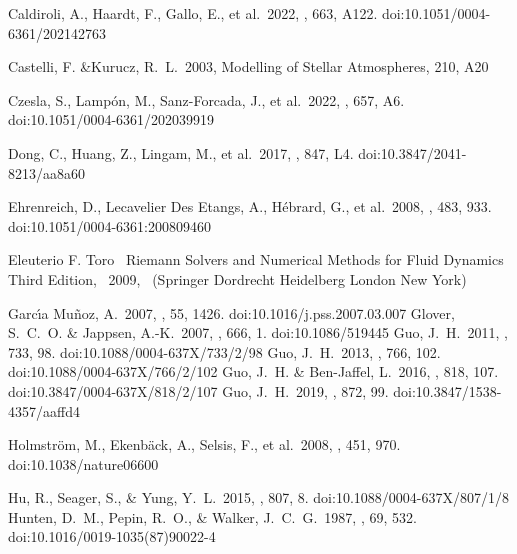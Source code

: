 \documentclass[journal, onecolumn]{aastex631}
\begin{document}
\begin{CJK*}{UTF8}{gbsn}
\begin{thebibliography}{99}
 Caldiroli, A., Haardt, F., Gallo, E., et al.\ 2022, \aap, 663, A122. doi:10.1051/0004-6361/202142763

 Castelli, F. \&Kurucz, R.~L.\ 2003, Modelling of Stellar Atmospheres, 210, A20

 Czesla, S., Lamp{\'o}n, M., Sanz-Forcada, J., et al.\ 2022, \aap, 657, A6. doi:10.1051/0004-6361/202039919

 Dong, C., Huang, Z., Lingam, M., et al.\ 2017, \apjl, 847, L4. doi:10.3847/2041-8213/aa8a60

 Ehrenreich, D., Lecavelier Des Etangs, A., H{\'e}brard, G., et al.\ 2008, \aap, 483, 933. doi:10.1051/0004-6361:200809460

 Eleuterio F. Toro \ Riemann Solvers and Numerical Methods for Fluid Dynamics Third Edition, \ 2009, \ (Springer Dordrecht Heidelberg London New York)

 Garc{\'\i}a Mu{\~n}oz, A.\ 2007, \planss, 55, 1426. doi:10.1016/j.pss.2007.03.007
 Glover, S.~C.~O. \& Jappsen, A.-K.\ 2007, \apj, 666, 1. doi:10.1086/519445
 Guo, J.~H.\ 2011, \apj, 733, 98. doi:10.1088/0004-637X/733/2/98
 Guo, J.~H.\ 2013, \apj, 766, 102. doi:10.1088/0004-637X/766/2/102
 Guo, J.~H. \& Ben-Jaffel, L.\ 2016, \apj, 818, 107. doi:10.3847/0004-637X/818/2/107
 Guo, J.~H.\ 2019, \apj, 872, 99. doi:10.3847/1538-4357/aaffd4

 Holmstr{\"o}m, M., Ekenb{\"a}ck, A., Selsis, F., et al.\ 2008, \nat, 451, 970. doi:10.1038/nature06600

 Hu, R., Seager, S., \& Yung, Y.~L.\ 2015, \apj, 807, 8. doi:10.1088/0004-637X/807/1/8
 Hunten, D.~M., Pepin, R.~O., \& Walker, J.~C.~G.\ 1987, \icarus, 69, 532. doi:10.1016/0019-1035(87)90022-4



\end{thebibliography}
\end{CJK*}
\end{document}
